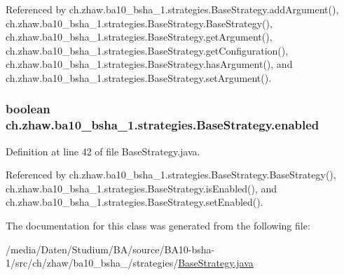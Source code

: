 Referenced by ch.zhaw.ba10\_\-bsha\_\-1.strategies.BaseStrategy.addArgument(), ch.zhaw.ba10\_\-bsha\_\-1.strategies.BaseStrategy.BaseStrategy(), ch.zhaw.ba10\_\-bsha\_\-1.strategies.BaseStrategy.getArgument(), ch.zhaw.ba10\_\-bsha\_\-1.strategies.BaseStrategy.getConfiguration(), ch.zhaw.ba10\_\-bsha\_\-1.strategies.BaseStrategy.hasArgument(), and ch.zhaw.ba10\_\-bsha\_\-1.strategies.BaseStrategy.setArgument().\hypertarget{classch_1_1zhaw_1_1ba10__bsha__1_1_1strategies_1_1BaseStrategy_a5799e7f094efcf8d18d8788e9c911787}{
\subsubsection[{enabled}]{\setlength{\rightskip}{0pt plus 5cm}boolean {\bf ch.zhaw.ba10\_\-bsha\_\-1.strategies.BaseStrategy.enabled}}}
\label{classch_1_1zhaw_1_1ba10__bsha__1_1_1strategies_1_1BaseStrategy_a5799e7f094efcf8d18d8788e9c911787}


Definition at line 42 of file BaseStrategy.java.

Referenced by ch.zhaw.ba10\_\-bsha\_\-1.strategies.BaseStrategy.BaseStrategy(), ch.zhaw.ba10\_\-bsha\_\-1.strategies.BaseStrategy.isEnabled(), and ch.zhaw.ba10\_\-bsha\_\-1.strategies.BaseStrategy.setEnabled().

The documentation for this class was generated from the following file:\begin{DoxyCompactItemize}
\item 
/media/Daten/Studium/BA/source/BA10-\/bsha-\/1/src/ch/zhaw/ba10\_\-bsha\_/strategies/\hyperlink{BaseStrategy_8java}{BaseStrategy.java}\end{DoxyCompactItemize}

